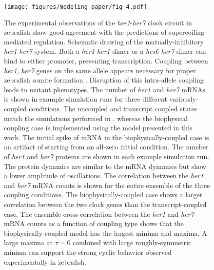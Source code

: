 \documentclass[11pt]{article}
\begin{document}
\begin{figure}[h]
    \centering
    {\texttt{[image: figures/modeling\_paper/fig\_4.pdf]}
    \label{fig:her1_her7_cartoon}
    \label{fig:zinani_summary_cartoon}
    \label{fig:zinani_mRNA_behavior}
    \label{fig:zinani_protein_behavior}
    \label{fig:zinani_correlation_coeff}
    \label{fig:zinani_cross_correlation}
    }
\end{figure}
\begin{figure}[h]
    \ContinuedFloat
    \caption{The experimental observations of the \textit{her1}-\textit{her7} clock circuit in zebrafish\parencite{zinaniPairingSegmentationClock2021} show good agreement with the predictions of supercoiling-mediated regulation.
         Schematic drawing of the mutually-inhibitory \textit{her1}-\textit{her7} system. Both a \textit{her1-her1} dimer or a \textit{hes6-her7} dimer can bind to either promoter, preventing transcription.
         Coupling between \textit{her1}, \textit{her7} genes on the same allele appears necessary for proper zebrafish somite formation \parencite{zinaniPairingSegmentationClock2021}. Disruption of this intra-allele coupling leads to mutant phenotypes.
         The number of \textit{her1} and \textit{her7} mRNAs is shown in example simulation runs for three different variously-coupled conditions. The uncoupled and transcript coupled states match the simulations performed in \textcite{zinaniPairingSegmentationClock2021}, whereas the biophysical coupling case is implemented using the model presented in this work. The initial spike of mRNA in the biophysically-coupled case is an artifact of starting from an all-zero initial condition.
         The number of \textit{her1} and \textit{her7} proteins are shown in each example simulation run. The protein dynamics are similar to the mRNA dynamics but show a lower amplitude of oscillations.
         The correlation between the \textit{her1} and \textit{her7} mRNA counts is shown for the entire ensemble of the three coupling conditions. The biophysically-coupled case shows a larger correlation between the two clock genes than the transcript-coupled case.
         The ensemble cross-correlation between the \textit{her1} and \textit{her7} mRNA counts as a function of coupling type shows that the biophysically-coupled model has the largest minima and maxima. A large maxima at \(\tau = 0\) combined with large roughly-symmetric minima can support the strong cyclic behavior observed experimentally in zebrafish.
    } \label{fig:top:her1_her7}
\end{figure}
\end{document}
